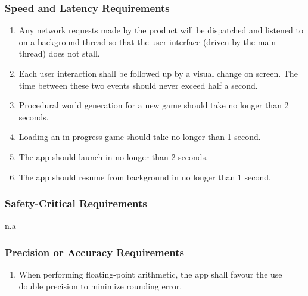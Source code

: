 \documentclass[]{article}
\begin{document}
\subsubsection{Speed and Latency Requirements}
\label{ssub:speed_and_latency_requirements}
\begin{enumerate}[{PR}1. ]
	\item Any network requests made by the product will be dispatched and listened to on a background thread so that the user interface (driven by the main thread) does not stall.
	\item Each user interaction shall be followed up by a visual change on screen. The time between these two events should never exceed half a second.
	\item Procedural world generation for a new game should take no longer than 2 seconds.
	\item Loading an in-progress game should take no longer than 1 second.
	\item The app should launch in no longer than 2 seconds.
	\item The app should resume from background in no longer than 1 second.
	\holdEnum
\end{enumerate}

\subsubsection{Safety-Critical Requirements}
\label{ssub:safety_critical_requirements}
n.a

\subsubsection{Precision or Accuracy Requirements}
\label{ssub:precision_or_accuracy_requirements}
\begin{enumerate}[{PR}1. ]
	\resumeEnum
	\item When performing floating-point arithmetic, the app shall favour the use double precision to minimize rounding error.
	\holdEnum
\end{enumerate}
\end{document}
